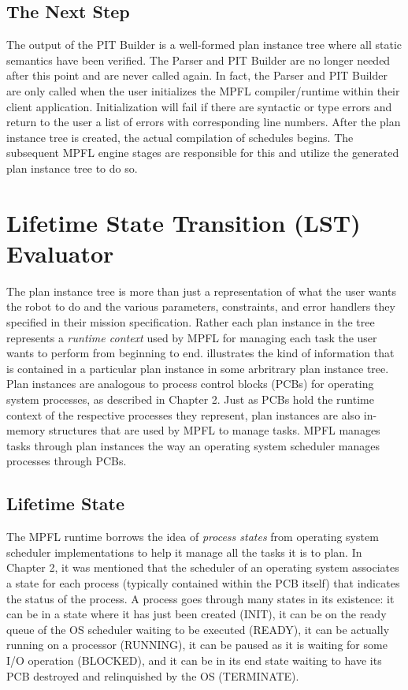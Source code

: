 \subsection{The Next Step}
The output of the PIT Builder is a well-formed plan instance tree where all static semantics have been verified. The Parser and PIT Builder are no longer needed after this point and are never called again. In fact, the Parser and PIT Builder are only called when the user initializes the MPFL compiler/runtime within their client application. Initialization will fail if there are syntactic or type errors and return to the user a list of errors with corresponding line numbers. After the plan instance tree is created, the actual compilation of schedules begins. The subsequent MPFL engine stages are responsible for this and utilize the generated plan instance tree to do so. 

\section{Lifetime State Transition (LST) Evaluator}
The plan instance tree is more than just a representation of what the user wants the robot to do and the various parameters, constraints, and error handlers they specified in their mission specification. Rather each plan instance in the tree represents a \textit{runtime context} used by MPFL for managing each task the user wants to perform from beginning to end.  illustrates the kind of information that is contained in a particular plan instance in some arbritrary plan instance tree. Plan instances are analogous to process control blocks (PCBs) for operating system processes, as described in Chapter 2. Just as PCBs hold the runtime context of the respective processes they represent, plan instances are also in-memory structures that are used by MPFL to manage tasks. MPFL manages tasks through plan instances the way an operating system scheduler manages processes through PCBs.


\subsection{Lifetime State}
The MPFL runtime borrows the idea of \textit{process states} from operating system scheduler implementations to help it manage all the tasks it is to plan. In Chapter 2, it was mentioned that the scheduler of an operating system associates a state for each process (typically contained within the PCB itself) that indicates the status of the process. A process goes through many states in its existence: it can be in a state where it has just been created (INIT), it can be on the ready queue of the OS scheduler waiting to be executed (READY), it can be actually running on a processor (RUNNING), it can be paused as it is waiting for some I/O operation (BLOCKED), and it can be in its end state waiting to have its PCB destroyed and relinquished by the OS (TERMINATE). 

